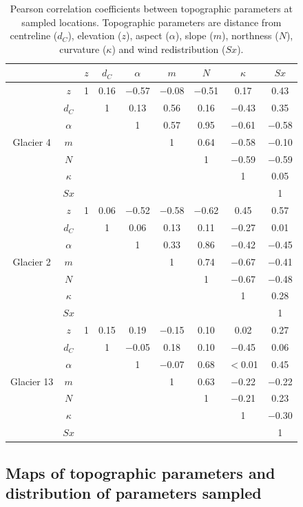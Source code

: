 \documentclass{sfuthesis}
\newcommand{\params}{Topographic parameters are distance from centreline ($d_C$), elevation ($z$), aspect ($\alpha$), slope ($m$), northness ($N$), curvature ($\kappa$) and wind redistribution ($Sx$). }
\begin{document}
\begin{table}[H]
\centering
\caption{Pearson correlation coefficients between topographic parameters at sampled locations. \params}
\label{tab:pearson_correlation}
\begin{tabular}{cc|ccccccc}
 &  & $z$ & $d_C$ & $\alpha$ & $m$ & $N$ & $\kappa$ & $Sx$ \\ \hline
\multirow{7}{*}{Glacier 4} & $z$ & 1 & 0.16 & $-$0.57 & $-$0.08 & $-$0.51 & 0.17 & 0.43 \\
 & $d_C$ &  & 1 & 0.13 & 0.56 & 0.16 & $-$0.43 & 0.35 \\
 & $\alpha$ &   &  & 1 & 0.57 & 0.95 & $-$0.61 & $-$0.58 \\
 & $m$ &   &   &   & 1 & 0.64 & $-$0.58 & $-$0.10 \\
 & $N$ &   &   &   &   & 1 & $-$0.59 & $-$0.59 \\
 & $\kappa$ &   &   &   &   &   & 1 & 0.05 \\
 & $Sx$ &   &   &   &   &   &   & 1 \\ \hline
\multirow{7}{*}{Glacier 2} & $z$ & 1 & 0.06 & $-$0.52 & $-$0.58 & $-$0.62 & 0.45 & 0.57 \\
 & $d_C$ &   & 1 & 0.06 & 0.13 & 0.11 & $-$0.27 & 0.01 \\
 & $\alpha$ &   &  & 1 & 0.33 & 0.86 & $-$0.42 & $-$0.45 \\
 & $m$ &   &   &   & 1 & 0.74 & $-$0.67 & $-$0.41 \\
 & $N$ &   &   &   &   & 1 & $-$0.67 & $-$0.48 \\
 & $\kappa$ & &   &   &   &   & 1 & 0.28 \\
 & $Sx$ &   &   &   &   &   &   & 1 \\ \hline
\multirow{7}{*}{Glacier 13} & $z$ & 1 & 0.15 & 0.19 & $-$0.15 & 0.10 & 0.02 & 0.27 \\
 & $d_C$ &   & 1 & $-$0.05 & 0.18 & 0.10 & $-$0.45 & 0.06 \\
 & $\alpha$ &   &   & 1 & $-$0.07 & 0.68 & $<$0.01 & 0.45 \\
 & $m$ &   &   &   & 1 & 0.63 & $-$0.22 & $-$0.22 \\
 & $N$ &   &   &   &   & 1 & $-$0.21 & 0.23 \\
 & $\kappa$ &   &   &   &   &   & 1 & $-$0.30 \\
 & $Sx$ &   &   &   &   &   &   & 1
\end{tabular}
\end{table}


\subsection{Maps of topographic parameters and distribution of parameters sampled}
\end{document}
